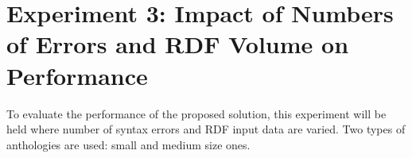 \section{Experiment 3: Impact of Numbers of Errors and RDF Volume on Performance}

To evaluate the performance of the proposed solution, this experiment will be held where number of syntax errors and RDF input data are varied. Two types of anthologies are used: small and medium size ones.  









